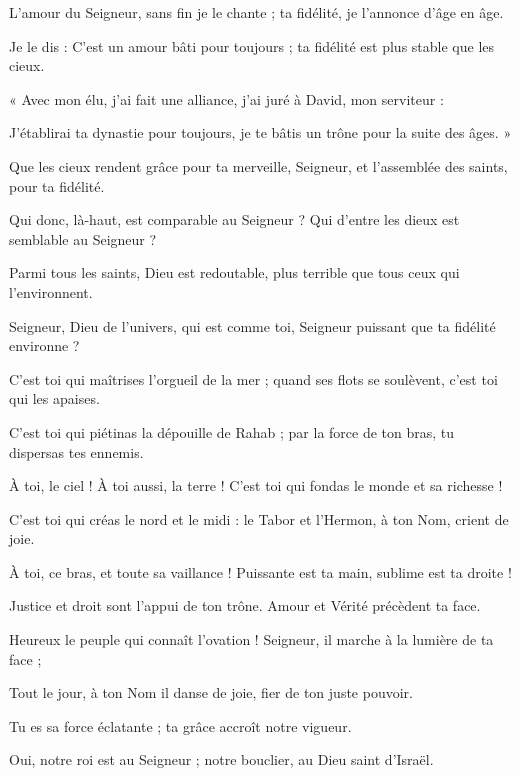 \item L'amour du Seigneur, sans fin je le chante ; ta fidélité, je l'annonce d'âge en âge.
\item Je le dis : C'est un amour bâti pour toujours ; ta fidélité est plus stable que les cieux.
\item « Avec mon élu, j'ai fait une alliance, j'ai juré à David, mon serviteur :
\item J'établirai ta dynastie pour toujours, je te bâtis un trône pour la suite des âges. »
\item Que les cieux rendent grâce pour ta merveille, Seigneur, et l'assemblée des saints, pour ta fidélité.
\item Qui donc, là-haut, est comparable au Seigneur ? Qui d'entre les dieux est semblable au Seigneur ?
\item Parmi tous les saints, Dieu est redoutable, plus terrible que tous ceux qui l'environnent.
\item Seigneur, Dieu de l'univers, qui est comme toi, Seigneur puissant que ta fidélité environne ?
\item C'est toi qui maîtrises l'orgueil de la mer ; quand ses flots se soulèvent, c'est toi qui les apaises.
\item C'est toi qui piétinas la dépouille de Rahab ; par la force de ton bras, tu dispersas tes ennemis.
\item À toi, le ciel ! À toi aussi, la terre ! C'est toi qui fondas le monde et sa richesse !
\item C'est toi qui créas le nord et le midi : le Tabor et l'Hermon, à ton Nom, crient de joie.
\item À toi, ce bras, et toute sa vaillance ! Puissante est ta main, sublime est ta droite !
\item Justice et droit sont l'appui de ton trône. Amour et Vérité précèdent ta face.
\item Heureux le peuple qui connaît l'ovation ! Seigneur, il marche à la lumière de ta face ;
\item Tout le jour, à ton Nom il danse de joie, fier de ton juste pouvoir.
\item Tu es sa force éclatante ; ta grâce accroît notre vigueur.
\item Oui, notre roi est au Seigneur ; notre bouclier, au Dieu saint d'Israël.
